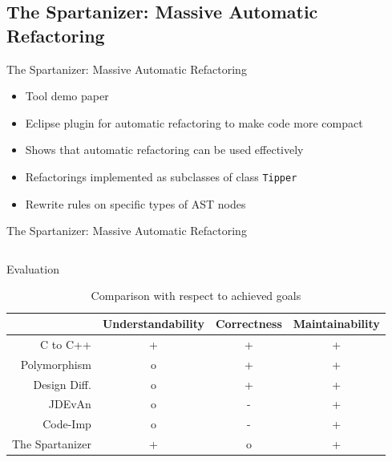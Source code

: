 \documentclass{beamer}
\begin{document}
\subsection{The Spartanizer: Massive Automatic Refactoring}

\begin{frame}{The Spartanizer: Massive Automatic Refactoring}
  \begin{itemize}
    \item Tool demo paper
    \item Eclipse plugin for automatic refactoring to make code more compact
    \pause
    \item Shows that automatic refactoring can be used effectively
  \end{itemize}
  \pause
  \begin{itemize}
    \item Refactorings implemented as subclasses of class \texttt{Tipper}
    \item Rewrite rules on specific types of AST nodes
  \end{itemize}
\end{frame}

\begin{frame}[fragile]{The Spartanizer: Massive Automatic Refactoring}
  \begin{columns}[T]
    \begin{column}{.49\textwidth}
      
    \end{column}
    \begin{column}{.5\textwidth}
      
    \end{column}
  \end{columns}
\end{frame}

\begin{frame}{Evaluation} 
  \begin{table}[htb]
    \centering
    \caption{Comparison with respect to achieved goals}
    \label{tbl:goals}
    \begin{tabular}{r|ccc}
      ~               & Understandability & Correctness & Maintainability \\ \hline
      C to C++        & +                 & +           & + \\
      Polymorphism    & o                 & +           & + \\
      Design Diff.    & o                 & +           & + \\
      JDEvAn          & o                 & -           & + \\
      Code-Imp        & o                 & -           & + \\
      The Spartanizer & +                 & o           & + \\
    \end{tabular}
  \end{table}
\end{frame}
\end{document}
